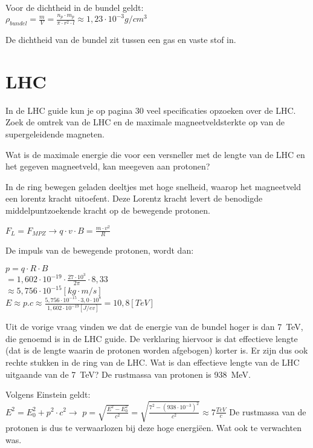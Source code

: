 \begin{questions}
Voor de dichtheid in de bundel geldt:\\
$\rho_{bundel} = \frac{m}{V} = \frac{n_{p} \cdot m_{p}}{\pi \cdot r^2 \cdot l} \approx 1,23 \cdot 10^{-3} g/cm^{3}$

De dichtheid van de bundel zit tussen een gas en vaste stof in.

\section{LHC}

In de LHC guide kun je op pagina 30 veel specificaties opzoeken over de LHC.
\question
Zoek de omtrek van de LHC en de maximale magneetveldsterkte op van de 
supergeleidende magneten.

\question 
Wat is de maximale energie die voor een versneller met de lengte van de LHC en
het gegeven magneetveld, kan meegeven aan protonen? 


In de ring bewegen geladen deeltjes met hoge snelheid, waarop het magneetveld
een lorentz kracht uitoefent. Deze Lorentz kracht levert de benodigde middelpuntzoekende
kracht op de bewegende protonen.

$F_L = F_{MPZ} \rightarrow q \cdot v \cdot B = \frac{m \cdot v^2}{R}$

De impuls van de bewegende protonen, wordt dan:


$ p = q \cdot R \cdot B $ \\
$   = 1,602 \cdot 10^{-19} \cdot \frac{27\cdot 10^3}{2\pi} \cdot 8,33 $ \\
$ \approx 5,756 \cdot 10^{-15} [kg\cdot m/s]$ \\
$ E \approx p.c \approx \frac{5,756 \cdot 10^{-15} \cdot 3,0 \cdot 10^8}{1,602 \cdot 10^{-19} [J/ev]} = 10,8 [TeV]$

\question
Uit de vorige vraag vinden we dat de energie van de bundel hoger is dan \SI{7}{\tera\electronvolt},
die genoemd is in de LHC guide. De verklaring hiervoor is dat effectieve lengte (dat is de lengte waarin de protonen worden
afgebogen) korter is. Er zijn dus ook rechte stukken in de ring van de LHC.
Wat is dan effectieve lengte van de LHC uitgaande van de
\SI{7}{\tera\electronvolt}? De rustmassa van protonen is \SI{938}{\mega\electronvolt}.


Volgens Einstein geldt:\\
$E^2 = E_0^2 + p^2 \cdot c^2 \rightarrow $
$p = \sqrt{\frac{E^2 -E_0^2}{c^2}} = \sqrt{\frac{7^2 -(938 \cdot 10^{-3})^2}{c^2}} \approx 7\frac{TeV}{c}$
De rustmassa van de protonen is dus te verwaarlozen bij deze hoge energiëen. 
Wat ook te verwachten was. 


\end{questions}
